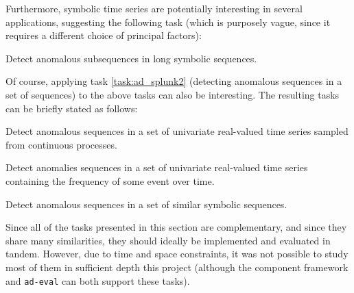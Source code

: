 Furthermore, symbolic time series are potentially interesting in several applications, suggesting the following task (which is purposely vague, since it requires a different choice of principal factors): 

\begin{task}
  Detect anomalous subsequences in long symbolic sequences.
\end{task}

Of course, applying task \ref{task:ad_splunk2} (detecting anomalous sequences in a set of sequences) to the above tasks can also be interesting. The resulting tasks can be briefly stated as follows:

\begin{task}
  Detect anomalous sequences in a set of univariate real-valued time series sampled from continuous processes.
\end{task}

\begin{task}
  Detect anomalies sequences in a set of univariate real-valued time series containing the frequency of some event over time.
\end{task}

\begin{task}
  Detect anomalous sequences in a set of similar symbolic sequences.
\end{task}

Since all of the tasks presented in this section are complementary, and since they share many similarities, they should ideally be implemented and evaluated in tandem. However, due to time and space constraints, it was not possible to study most of them in sufficient depth this project (although the component framework and \texttt{ad-eval} can both support these tasks).
